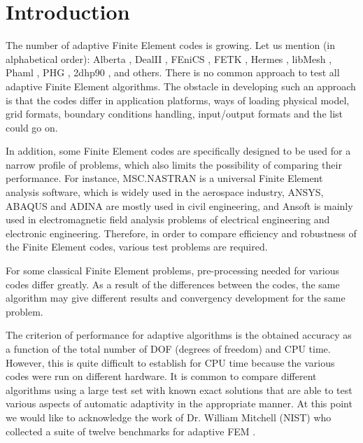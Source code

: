 \section{Introduction}
\label{sec:intro}

The number of adaptive Finite Element codes is growing.
Let us mention (in alphabetical order): Alberta
\cite{alberta}, DealII \cite{dealii}, FEniCS
\cite{fenics}, FETK \cite{fetk}, Hermes \cite{hermes}, 
libMesh \cite{libmesh}, Phaml \cite{phaml}, PHG \cite{phg}, 
2dhp90 \cite{2dhp90}, and others.
There is no common approach to test all adaptive 
Finite Element algorithms. The obstacle in developing such an approach is that the codes differ in application platforms, ways of loading physical model, grid formats, boundary conditions handling, input/output formats and the list could go on. 

In addition, some Finite Element codes are specifically designed to be used for a narrow profile of problems, which also limits the possibility of comparing their performance.
For instance, MSC.NASTRAN is a universal Finite Element analysis software, 
which is widely used in the aerospace industry, ANSYS, ABAQUS and ADINA are 
mostly used in civil engineering, and Ansoft is mainly used in electromagnetic 
field analysis problems of electrical engineering and electronic engineering. 
Therefore, in order to compare efficiency and robustness of the Finite Element codes, various test problems are required. 

For some classical Finite Element problems, pre-processing needed for various codes differ greatly. As a result of the differences between the codes, the same algorithm may give different results and convergency development for the same problem.

The criterion of performance for adaptive algorithms is the obtained accuracy as a function of the total number
of DOF (degrees of freedom) and CPU time. However, this is quite difficult to establish
for CPU time because the various codes were run on different hardware.
It is common to compare different algorithms using a large test set
with known exact solutions that are able to test various aspects of
automatic adaptivity in the appropriate manner. 
At this point we would like to acknowledge the work of
Dr. William Mitchell (NIST) who collected a suite of
twelve benchmarks for adaptive FEM \cite{mitchell-1}. 

